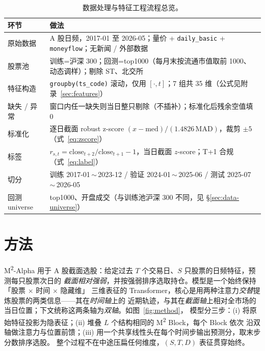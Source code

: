 \documentclass[a4paper,11pt,fontset=fandol]{ctexart}
\newcommand{\msq}{\texorpdfstring{M\textsuperscript{2}}{M2}}  %
\newcommand{\msqa}{\texorpdfstring{M\textsuperscript{2}-Alpha}{M2-Alpha}} %
\begin{document}
\begin{table}[H]
\centering
\caption{数据处理与特征工程流程总览。}
\label{tab:pipeline}
\begin{tabularx}{\linewidth}{l>{\raggedright\arraybackslash}X}
\toprule
环节 & 做法 \\
\midrule
原始数据   & A 股日频，2017-01 至 2026-05；量价 + \texttt{daily\_basic} + \texttt{moneyflow}；无新闻 / 外部数据 \\
股票池     & 训练=沪深 300；回测=top1000（每月末按流通市值取前 1000、动态调样）；剔除 ST、北交所 \\
特征构造   & \texttt{groupby(ts\_code)} 滚动，仅用 $[\cdot,t]$；7 组共 35 维（公式见附录~\ref{sec:features}） \\
缺失 / 异常 & 窗口内任一缺失则当日整只剔除（不插补）；标准化后残余空值填 $0$ \\
标准化     & 逐日截面 robust z-score $(x{-}\mathrm{med})/(1.4826\,\mathrm{MAD})$，裁剪 $\pm5$（式~\ref{eq:zscore}） \\
标签       & $r_{s,t}{=}\mathrm{close}_{t+2}/\mathrm{close}_{t+1}{-}1$，当日截面 $z$-score；T+1 合规（式~\ref{eq:label}） \\
切分       & 训练 2017-01\,$\sim$\,2023-12 / 验证 2024-01\,$\sim$\,2025-06 / 测试 2025-07\,$\sim$\,2026-05 \\
回测 universe & top1000、开盘成交（与训练池沪深 300 不同，见 §\ref{sec:data-universe}） \\
\bottomrule
\end{tabularx}
\end{table}

\section{方法}\label{sec:method}

\msqa{} 用于 A 股截面选股：给定过去 $T$ 个交易日、$S$ 只股票的日频特征，预测每只股票次日的
\emph{截面相对强弱}，并按强弱排序选取持仓。模型是一个始终保持「股票 $\times$ 时间 $\times$ 隐藏维」
三维表征的 Transformer，核心是用两种注意力\emph{交替}提炼股票的两类信息——其在\emph{时间轴}上的
近期轨迹，与其在\emph{截面轴}上相对全市场的当日位置；下文统称这两条轴为\emph{双轴}。如图~\ref{fig:method}，
模型分三步：(i) 将原始特征投影为隐表征；(ii) 堆叠 $L$ 个结构相同的 \msq{} Block，每个 Block 依次
沿双轴做注意力与位置前馈；(iii) 用一个共享线性头在每个时间步输出预测分，取末步分数排序选股。
整个过程不在中途压扁任何维度，$(S,T,D)$ 表征贯穿始终。
\end{document}
